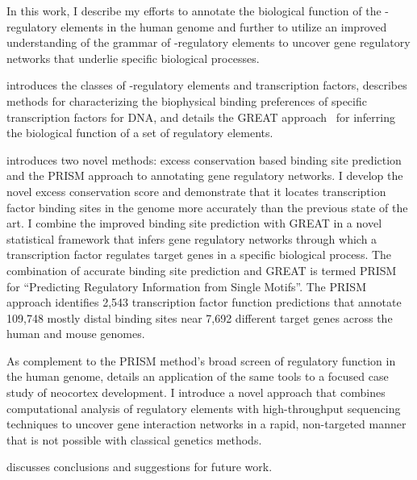 In this work, I describe my efforts to annotate the biological function of the \cis-regulatory elements in the human genome and further
to utilize an improved understanding of the grammar of \cis-regulatory elements to uncover gene regulatory networks that underlie
specific biological processes.
%

 introduces the classes of \cis-regulatory elements and transcription factors,
describes methods for characterizing the biophysical binding preferences of specific transcription factors for DNA, and details the 
GREAT approach~\citep{McLean2010} for inferring the biological function of a set of regulatory elements.
%

 introduces two novel methods: excess conservation based binding site prediction and the PRISM approach to
annotating gene regulatory networks.  I develop the novel excess conservation score and demonstrate that it locates transcription factor
binding sites in the genome more accurately than the previous state of the art.  I combine the improved binding site prediction with
GREAT in a novel statistical framework that infers gene regulatory networks through which a transcription factor regulates
target genes in a specific biological process.  The combination of accurate binding site prediction and GREAT is termed PRISM for
``Predicting Regulatory Information from Single Motifs''.  The PRISM approach identifies 2,543 transcription factor function predictions
that annotate 109,748 mostly distal binding sites near 7,692 different target genes across the human and mouse genomes.
%

As complement to the PRISM method's broad screen of regulatory function in the human genome,  details an application
of the same tools to a focused case study of neocortex development.  I introduce a novel approach that combines computational
analysis of regulatory elements with high-throughput sequencing techniques to uncover gene interaction networks in a rapid, non-targeted
manner that is not possible with classical genetics methods.
%

 discusses conclusions and suggestions for future work.
%
